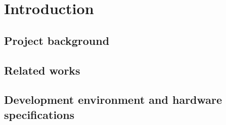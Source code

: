 
\chapter{Introduction}
\label{chap:intro}


\section{Project background}




\section{Related works}




\section{Development environment and hardware specifications}
\label{sec:intro:spec}
